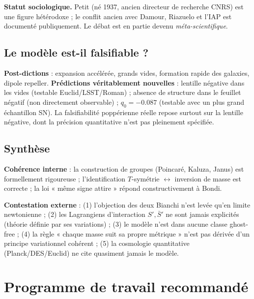 \documentclass[11pt,a4paper]{article}
\theoremstyle{definition}
\theoremstyle{plain}
\newcommand{\Sbar}{\bar{S}}
\begin{document}
\textbf{Statut sociologique.} Petit (né 1937, ancien directeur de recherche CNRS) est une figure
hétérodoxe ; le conflit ancien avec Damour, Riazuelo et l'IAP est documenté publiquement. Le
débat est en partie devenu \emph{méta-scientifique}.

\subsection{Le modèle est-il falsifiable ?}

\textbf{Post-dictions} : expansion accélérée, grands vides, formation rapide des galaxies,
dipole repeller. \textbf{Prédictions véritablement nouvelles} : lentille négative dans les
vides (testable Euclid/LSST/Roman) ; absence de structure dans le feuillet négatif (non
directement observable) ; $q_0=-0.087$ (testable avec un plus grand échantillon SN). La
falsifiabilité poppérienne réelle repose surtout sur la lentille négative, dont la précision
quantitative n'est pas pleinement spécifiée.

\subsection{Synthèse}

\textbf{Cohérence interne} : la construction de groupes (Poincaré, Kaluza, Janus) est
formellement rigoureuse ; l'identification $T$-symétrie $\leftrightarrow$ inversion de masse est
correcte ; la loi « même signe attire » répond constructivement à Bondi.

\textbf{Contestation externe} : (1) l'objection des deux Bianchi n'est levée qu'en limite
newtonienne ; (2) les Lagrangiens d'interaction $S',\Sbar'$ ne sont jamais explicités (théorie
définie par ses variations) ; (3) le modèle n'est dans aucune classe ghost-free ; (4) la règle
« chaque masse suit sa propre métrique » n'est pas dérivée d'un principe variationnel cohérent ;
(5) la cosmologie quantitative (Planck/DES/Euclid) ne cite quasiment jamais le modèle.

\section{Programme de travail recommandé}
\end{document}
